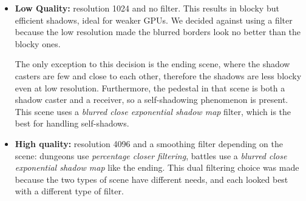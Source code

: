 \begin{itemize}
    \item \textbf{Low Quality:} resolution 1024 and no filter. This results in blocky but efficient shadows, ideal for weaker GPUs. We decided against using a filter because the low resolution made the blurred borders look no better than the blocky ones.

    The only exception to this decision is the ending scene, where the shadow casters are few and close to each other, therefore the shadows are less blocky even at low resolution. Furthermore, the pedestal in that scene is both a shadow caster and a receiver, so a self-shadowing phenomenon is present. This scene uses a \textit{blurred close exponential shadow map} filter, which is the best for handling self-shadows.
    
    \item \textbf{High quality:} resolution 4096 and a smoothing filter depending on the scene: dungeons use \textit{percentage closer filtering}, battles use a \textit{blurred close exponential shadow map} like the ending. This dual filtering choice was made because the two types of scene have different needs, and each looked best with a different type of filter.
\end{itemize}